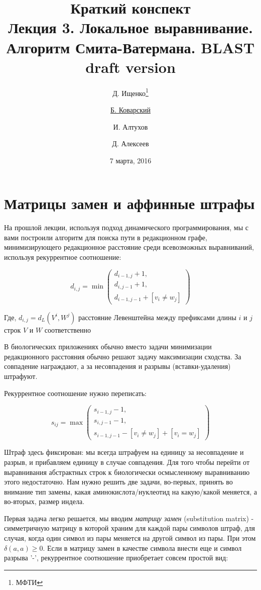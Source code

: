 \documentclass[letterpaper, 11pt]{article}
\title{\large{Краткий конспект}\\
\LARGE{Лекция 3. Локальное выравнивание. Алгоритм Смита-Ватермана. BLAST}\\
\normalsize{\textcolor{NavyBlue}{draft version}}}
\date{7 марта, 2016}
\author{Д. Ищенко\thanks{МФТИ} \and \underline{Б. Коварский\footnotemark[1]}
\and И. Алтухов\footnotemark[1] \and Д. Алексеев\footnotemark[1]}
\begin{document}
\maketitle
\thispagestyle{empty}
\clearpage

\section{Матрицы замен и аффинные штрафы}

На прошлой лекции, используя подход динамического программирования, мы с вами построили алгоритм для поиска пути в редакционном графе, минимизирующего редакционное расстояние среди всевозможных выравниваний, используя рекуррентное соотношение:

$$d_{i,j}=
\min
\begin{pmatrix}
	d_{i-1,j}+1, \\
	d_{i,j-1}+1, \\
	d_{i-1,j-1}+[v_i\ne w_j]
\end{pmatrix}$$

Где, $d_{i,j}=d_L(V^i,W^j)$ расстояние Левенштейна между префиксами длины $i$ и $j$ строк $V$ и $W$ соответственно

В биологических приложениях обычно вместо задачи минимизации редакционного расстояния обычно решают задачу максимизации сходства. За совпадение награждают, а за несовпадения и разрывы (вставки-удаления) штрафуют.

Рекуррентное соотношение нужно переписать:

$$s_{ij}=
\max
\begin{pmatrix}
	s_{i-1,j}-1, \\
	s_{i,j-1}-1, \\
	s_{i-1,j-1}-[v_i\ne w_j]+[v_i = w_j]
\end{pmatrix}$$

Штраф здесь фиксирован: мы всегда штрафуем на единицу за несовпадение и разрыв, и прибавляем единицу в случае совпадения. Для того чтобы перейти от выравнивания абстрактных строк к биологически осмысленному выравниванию этого недостаточно. Нам нужно решить две задачи, во-первых, принять во внимание тип замены, какая аминокислота/нуклеотид на какую/какой меняется, а во-вторых, размер индела.

Первая задача легко решается, мы вводим \textit{матрицу замен} (substitution matrix) - симметричную матрицу в которой храним для каждой пары символов штраф, для случая, когда один символ из пары меняется на другой символ из пары. При этом $\delta(a,a)\ge 0$. Если в матрицу замен в качестве символа внести еще и символ разрыва '-', рекуррентное соотношение приобретает совсем простой вид:
\end{document}
